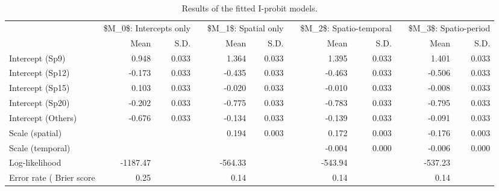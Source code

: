 \documentclass[a4paper,showframe,11pt]{report}\usepackage[]{graphicx}\usepackage[]{color}
\makeatletter
\newenvironment{kframe}{%
 \def\at@end@of@kframe{}%
 \ifinner\ifhmode%
  \def\at@end@of@kframe{\end{minipage}}%
  \begin{minipage}{\columnwidth}%
 \fi\fi%
 \def\FrameCommand##1{\hskip\@totalleftmargin \hskip-\fboxsep
 \colorbox{shadecolor}{##1}\hskip-\fboxsep
     \hskip-\linewidth \hskip-\@totalleftmargin \hskip\columnwidth}%
 \MakeFramed {\advance\hsize-\width
   \@totalleftmargin\z@ \linewidth\hsize
   \@setminipage}}%
 {\par\unskip\endMakeFramed%
 \at@end@of@kframe}
\makeatother
\begin{document}
\begin{kframe}
\singlespacing\end{kframe}
\begin{landscape}\begin{table}

\caption{\label{tab:table.btb}Results of the fitted I-probit models.}
\centering
\begin{tabular}[t]{lrrrrrrrrrrr}
\toprule
\multicolumn{1}{c}{ } & \multicolumn{2}{c}{\$M\_0\$: Intercepts only} & \multicolumn{1}{c}{ } & \multicolumn{2}{c}{\$M\_1\$: Spatial only} & \multicolumn{1}{c}{ } & \multicolumn{2}{c}{\$M\_2\$: Spatio-temporal} & \multicolumn{1}{c}{ } & \multicolumn{2}{c}{\$M\_3\$: Spatio-period} \\
\cmidrule(l{2pt}r{2pt}){2-3} \cmidrule(l{2pt}r{2pt}){5-6} \cmidrule(l{2pt}r{2pt}){8-9} \cmidrule(l{2pt}r{2pt}){11-12}
  & Mean & S.D. &   & Mean & S.D. &   & Mean & S.D. &   & Mean & S.D.\\
\midrule
Intercept (Sp9) & 0.948 & 0.033 &  & 1.364 & 0.033 &  & 1.395 & 0.033 &  & 1.401 & 0.033\\
Intercept (Sp12) & -0.173 & 0.033 &  & -0.435 & 0.033 &  & -0.463 & 0.033 &  & -0.506 & 0.033\\
Intercept (Sp15) & 0.103 & 0.033 &  & -0.020 & 0.033 &  & -0.010 & 0.033 &  & -0.008 & 0.033\\
Intercept (Sp20) & -0.202 & 0.033 &  & -0.775 & 0.033 &  & -0.783 & 0.033 &  & -0.795 & 0.033\\
Intercept (Others) & -0.676 & 0.033 &  & -0.134 & 0.033 &  & -0.139 & 0.033 &  & -0.091 & 0.033\\
Scale (spatial) &  &  &  & 0.194 & 0.003 &  & 0.172 & 0.003 &  & -0.176 & 0.003\\
Scale (temporal) &  &  &  &  &  &  & -0.004 & 0.000 &  & -0.006 & 0.000\\
Log-likelihood & -1187.47 &  &  & -564.33 &  &  & -543.94 &  &  & -537.23 & \\
Error rate (%
Brier score & 0.25 &  &  & 0.14 &  &  & 0.14 &  &  & 0.14 & \\
\bottomrule
\end{tabular}
\end{table}
\end{landscape}
\end{document}
